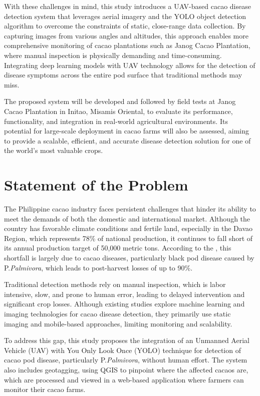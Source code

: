 {With these challenges in mind, this study introduces a UAV-based cacao disease detection system that leverages aerial imagery and the YOLO object detection algorithm to overcome the constraints of static, close-range data collection. By capturing images from various angles and altitudes, this approach enables more comprehensive monitoring of cacao plantations such as Janog Cacao Plantation, where manual inspection is physically demanding and time-consuming. Integrating deep learning models with UAV technology allows for the detection of disease symptoms across the entire pod surface that traditional methods may miss.

The proposed system will be developed and followed by field tests at Janog Cacao Plantation in Initao, Misamis Oriental, to evaluate its performance, functionality, and integration in real-world agricultural environments. Its potential for large-scale deployment in cacao farms will also be assessed, aiming to provide a scalable, efficient, and accurate disease detection solution for one of the world’s most valuable crops.


\section{Statement of the Problem}

The Philippine cacao industry faces persistent challenges that hinder its ability to meet the demands of both the domestic and international market. Although the country has favorable climate conditions and fertile land, especially in the Davao Region, which represents 78\% of national production, it continues to fall short of its annual production target of 50,000 metric tons. According to the \cite{PhilCacaoRoadmap2021}, this shortfall is largely due to cacao diseases, particularly black pod disease caused by P.\textit{Palmivora}, which leads to post-harvest losses of up to 90\%.

Traditional detection methods rely on manual inspection, which is labor intensive, slow, and prone to human error, leading to delayed intervention and significant crop losses. Although existing studies explore machine learning and imaging technologies for cacao disease detection, they primarily use static imaging and mobile-based approaches, limiting monitoring and scalability.

To address this gap, this study proposes the integration of an Unmanned Aerial Vehicle (UAV) with You Only Look Once (YOLO) technique for detection of cacao pod disease, particularly P.\textit{Palmivora}, without human effort. The system also includes geotagging, using QGIS to pinpoint where the affected cacaos are, which are processed and viewed in a web-based application where farmers can monitor their cacao farms.

}
